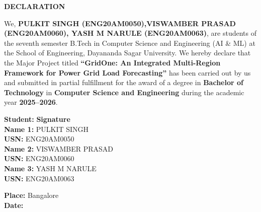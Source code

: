 \documentclass[ 12pt,a4paper,twocolumn,fleqn]{report}
\begin{document}
\newpage
  \pagestyle{plain}
\thisfancypage{%
  \setlength{\fboxsep}{20pt}\doublebox}{}
  \begin{center}
    \huge\textbf{DECLARATION}
\end{center}
\vspace{15mm}
We, \textbf{PULKIT SINGH (ENG20AM0050),VISWAMBER PRASAD (ENG20AM0060),
 YASH M NARULE (ENG20AM0063)}, are students of the seventh semester B.Tech in Computer Science and Engineering (AI \& ML) at the School of Engineering, Dayananda Sagar University. We hereby declare that the Major Project titled \textbf{“GridOne: An Integrated Multi-Region Framework for Power Grid Load Forecasting”} has been carried out by us and submitted in partial fulfillment for the award of a degree in \textbf{Bachelor of Technology} in \textbf{Computer Science and Engineering} during the academic year \textbf{2025--2026}.
\vspace{15 mm}


\noindent
\begin{minipage}{0.8\textwidth}
    \textbf{Student:} \hfill\textbf{Signature}\\
    
    \textbf{Name 1:} PULKIT SINGH\\ \textbf{USN:} ENG20AM0050 \\
    
    \textbf{Name 2:} VISWAMBER PRASAD \\ \textbf{USN:} ENG20AM0060 \\
    
    \textbf{Name 3:} YASH M NARULE \\ \textbf{USN:} ENG20AM0063 \\

\end{minipage}

\begin{flushleft}
    \textbf{Place:} Bangalore \\
    \textbf{Date:} 
\end{flushleft}
\end{document}
